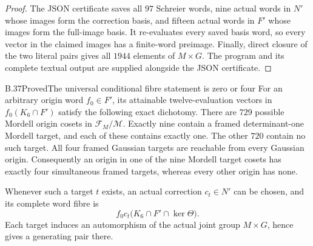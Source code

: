 \begin{proof}
The JSON certificate saves all $97$ Schreier words, nine actual
words in $N'$ whose images form the correction basis, and fifteen
actual words in $F'$ whose images form the full-image basis.
It re-evaluates every saved basis word, so every vector in the
claimed images has a finite-word preimage. Finally, direct closure
of the two literal pairs gives all $1944$ elements of $M\times G$.
The program and its complete textual output are supplied alongside
the JSON certificate.
\end{proof}

\begin{statement}{B.37}{Proved}{The universal conditional fibre statement is zero or four}
For an arbitrary origin word $f_0\in F'$, its attainable
twelve-evaluation vectors in $f_0(K_6\cap F')$ satisfy the following
exact dichotomy. There are $729$ possible Mordell origin cosets in
$\mathcal F_M/\mathcal M$. Exactly nine contain a framed
determinant-one Mordell target, and each of these contains exactly
one. The other $720$ contain no such target. All four framed
Gaussian targets are reachable from every Gaussian origin.
Consequently an origin in one of the nine Mordell target cosets
has exactly four simultaneous framed targets, whereas every
other origin has none.

Whenever such a target $t$ exists, an actual correction
$c_t\in N'$ can be chosen, and its complete word fibre is
\[
 f_0c_t\bigl(K_6\cap F'\cap\ker\Theta\bigr).                  \tag{ER2}
\]
Each target induces an automorphism of the actual joint group
$M\times G$, hence gives a generating pair there.
\end{statement}

